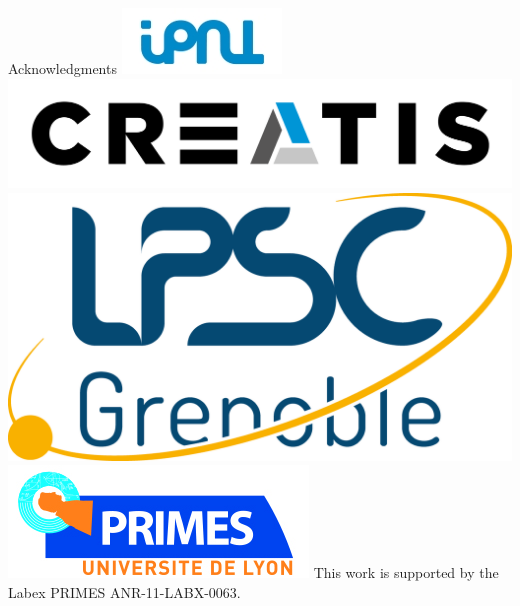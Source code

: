 \documentclass[final]{beamer} %
\begin{document}
\begin{frame}{}
	\begin{block}{Acknowledgments}
		\includegraphics[height=0.025\textheight]{./figures/logo_IPNL}
		\hspace{0.025\textwidth}
		\includegraphics[height=0.025\textheight]{./figures/logo-creatis}
		\hspace{0.025\textwidth}		
		\includegraphics[height=0.025\textheight]{./figures/Logo_LPSC}
		\hspace{0.025\textwidth}
		\includegraphics[height=0.025\textheight]{./figures/logo_primes}
		This work is supported by the Labex PRIMES ANR-11-LABX-0063.
% 
	\end{block}
	
      
    \end{frame}
  
\end{document}
